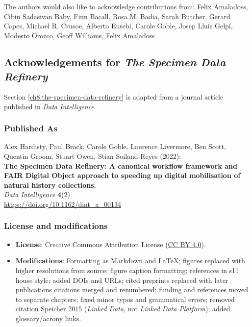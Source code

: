 The authors would also like to acknowledge contributions from: Felix
Amaladoss, Cibin Sadasivan Baby, Finn Bacall, Rosa M. Badia, Sarah
Butcher, Gerard Capes, Michael R. Crusoe, Alberto Eusebi, Carole Goble,
Josep Lluís Gelpí, Modesto Orozco, Geoff Williams, Felix Amaladoss


\subsection{Acknowledgements for \emph{The Specimen Data Refinery}}\label{ch11:refinery}

Section \vref{ch8:the-specimen-data-refinery} is adapted from a journal article published in \emph{Data Intelligence}.

\subsubsection*{Published As}

Alex Hardisty, Paul Brack, Carole Goble, Laurence Livermore, Ben Scott,
Quentin Groom, Stuart Owen, Stian Soiland-Reyes (2022):\\
\textbf{The Specimen Data Refinery: A canonical workflow framework and
FAIR Digital Object approach to speeding up digital mobilisation of
natural history collections.}\\
\emph{Data Intelligence} \textbf{4}(2)\\
\url{https://doi.org/10.1162/dint_a_00134}

\subsubsection*{License and modifications}

\begin{itemize}
\tightlist
\item
  \textbf{License}: Creative Commons Attribution License
  (\href{https://spdx.org/licenses/CC-BY-4.0}{CC BY 4.0}).
\item
  \textbf{Modifications}: Formatting as Markdown and LaTeX; figures replaced with higher resolutions from source; figure caption formatting; references in s11 house style; added DOIs and URLs; cited preprints replaced with later publications
  citations merged and renumbered; funding and references moved to separate chapters; fixed minor typos and grammatical errors; removed citation Speicher 2015 (\emph{Linked Data}, not \emph{Linked Data Platform}); added glossary/acrony links.
\end{itemize}


